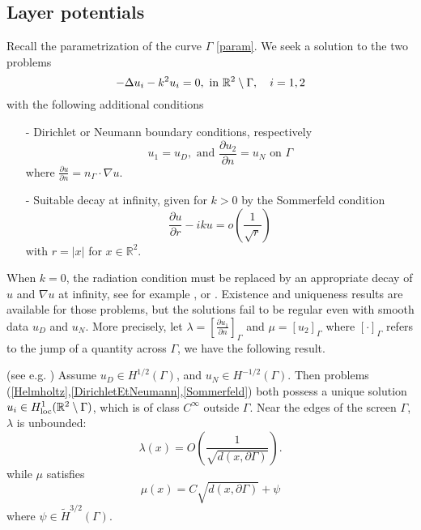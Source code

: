 \documentclass[a4paper]{article}
\begin{document}
\subsection{Layer potentials}

\label{sec:scattering}
Recall the parametrization of the curve $\Gamma$ \autoref{param}.
We seek a solution to the two problems
\begin{equation}
-\Delta u_i - k^2 u_i = 0,  \text{ in } \mathbb{R}^2 \setminus \Gamma, \quad i = 1,2
\end{equation}
with the following additional conditions
\begin{itemize}
	\item[-] Dirichlet or Neumann boundary conditions, respectively
	\begin{equation}
	u_1 = u_D, \text{ and  } \dfrac{\partial u_2}{\partial n} = u_N \text{ on } \Gamma
	\label{DirichletEtNeumann}
	\end{equation}
	where $\frac{\partial u}{\partial n} = n_\Gamma \cdot \nabla u$.
	\item[-] Suitable decay at infinity, given for $k > 0$ by the Sommerfeld condition
	\begin{equation}
	\dfrac{\partial u}{\partial r} - iku = o\left(\frac{1}{\sqrt{r}}\right)
	\end{equation}
	with $r=|x|$ for $x\in \mathbb{R}^2$.
\end{itemize}
When $k=0$, the radiation condition must be replaced by an appropriate decay of $u$ and $\nabla u$ at infinity, see for example \cite{wendland1990hypersingular,stephan1984augmented}, or \cite[Chap. 7]{mclean2000strongly} . 
Existence and uniqueness results are available for those problems, but the solutions fail to be regular even with smooth data $u_D$ and $u_N$. More precisely,  let $\lambda = \left[\frac{\partial u_1}{\partial n}\right]_\Gamma$ and $\mu = \left[u_2\right]_\Gamma$ where $ \left[\cdot \right]_\Gamma$ refers to the jump of a quantity across $\Gamma$, we have the following result.
\begin{The}
	(see e.g. \cite{stephan1984augmented,wendland1990hypersingular,monch1996numerical}) Assume $u_D \in H^{1/2}(\Gamma)$, and $u_N \in H^{-1/2}(\Gamma)$. Then problems (\ref{Helmholtz},\ref{DirichletEtNeumann},\ref{Sommerfeld}) both possess a unique solution $u_i \in H^1_\textup{loc}(\mathbb{R}^2 \setminus \Gamma)$, which is of class $C^{\infty}$ outside $\Gamma$. Near the edges of the screen $\Gamma$, $\lambda$ is unbounded:
	\[\lambda(x)  = O\left(\frac{1}{\sqrt{d(x,\partial \Gamma)}}\right).\]
	while $\mu$ satisfies
	\[\mu(x) = C\sqrt{d(x,\partial \Gamma)} + \psi\]
	where $\psi \in \tilde{H}^{3/2}(\Gamma)$.
	\label{theScatt}
\end{The}
\end{document}

